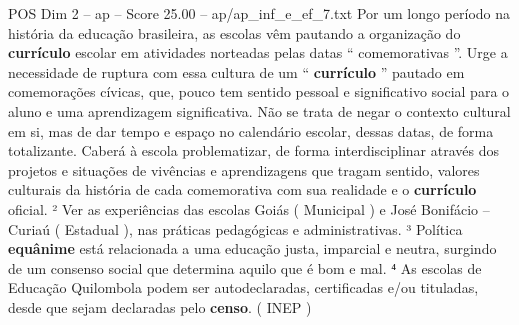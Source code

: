 \begin{textsample}{POS Dim 2 – ap – Score 25.00 – ap/ap\_inf\_e\_ef\_7.txt}
Por um longo período na história da educação brasileira, as escolas vêm pautando a organização do \textbf{currículo} escolar em atividades norteadas pelas datas “ comemorativas ”.
Urge a necessidade de ruptura com essa cultura de um “ \textbf{currículo} ” pautado em comemorações cívicas, que, pouco tem sentido pessoal e significativo social para o aluno e uma aprendizagem significativa.
Não se trata de negar o contexto cultural em si, mas de dar tempo e espaço no calendário escolar, dessas datas, de forma totalizante.
Caberá à escola problematizar, de forma interdisciplinar através dos projetos e situações de vivências e aprendizagens que tragam sentido, valores culturais da história de cada comemorativa com sua realidade e o \textbf{currículo} oficial. ² Ver as experiências das escolas Goiás ( Municipal ) e José Bonifácio – Curiaú ( Estadual ), nas práticas pedagógicas e administrativas. ³ Política \textbf{equânime} está relacionada a uma educação justa, imparcial e neutra, surgindo de um consenso social que determina aquilo que é bom e mal. ⁴ As escolas de Educação Quilombola podem ser autodeclaradas, certificadas e/ou tituladas, desde que sejam declaradas pelo \textbf{censo}. ( INEP )

\end{textsample}
